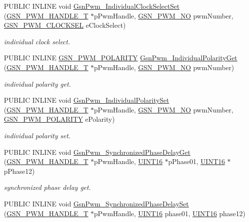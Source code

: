 \begin{DoxyCompactItemize}
PUBLIC INLINE void \hyperlink{a00650_gac6c42db84fde1e336b73ddc0e7099f34}{GsnPwm\_\-IndividualClockSelectSet} (\hyperlink{a00182}{GSN\_\-PWM\_\-HANDLE\_\-T} $\ast$pPwmHandle, \hyperlink{a00650_ga9afe1c7d571460ff2f6780bef6b433df}{GSN\_\-PWM\_\-NO} pwmNumber, \hyperlink{a00650_gafda5110eb592af71b799ed22c7ebf902}{GSN\_\-PWM\_\-CLOCKSEL} eClockSelect)
\begin{DoxyCompactList}\small\item\em individual clock select. \end{DoxyCompactList}\item 
PUBLIC INLINE \hyperlink{a00650_gaea0350ae8992c56b4a1bad6bc7ad5de1}{GSN\_\-PWM\_\-POLARITY} \hyperlink{a00650_ga6be7ff3ec663dc5896cd59c400e1c00b}{GsnPwm\_\-IndividualPolarityGet} (\hyperlink{a00182}{GSN\_\-PWM\_\-HANDLE\_\-T} $\ast$pPwmHandle, \hyperlink{a00650_ga9afe1c7d571460ff2f6780bef6b433df}{GSN\_\-PWM\_\-NO} pwmNumber)
\begin{DoxyCompactList}\small\item\em individual polarity get. \end{DoxyCompactList}\item 
PUBLIC INLINE void \hyperlink{a00650_ga37d8d36f2d0d597eb82ebebd1c4b9953}{GsnPwm\_\-IndividualPolaritySet} (\hyperlink{a00182}{GSN\_\-PWM\_\-HANDLE\_\-T} $\ast$pPwmHandle, \hyperlink{a00650_ga9afe1c7d571460ff2f6780bef6b433df}{GSN\_\-PWM\_\-NO} pwmNumber, \hyperlink{a00650_gaea0350ae8992c56b4a1bad6bc7ad5de1}{GSN\_\-PWM\_\-POLARITY} ePolarity)
\begin{DoxyCompactList}\small\item\em individual polarity set. \end{DoxyCompactList}\item 
PUBLIC INLINE void \hyperlink{a00650_ga8b61d6d4ed2a03b4130ece4db9f2949a}{GsnPwm\_\-SynchronizedPhaseDelayGet} (\hyperlink{a00182}{GSN\_\-PWM\_\-HANDLE\_\-T} $\ast$pPwmHandle, \hyperlink{a00660_ga09f1a1fb2293e33483cc8d44aefb1eb1}{UINT16} $\ast$pPhase01, \hyperlink{a00660_ga09f1a1fb2293e33483cc8d44aefb1eb1}{UINT16} $\ast$pPhase12)
\begin{DoxyCompactList}\small\item\em synchronized phase delay get. \end{DoxyCompactList}\item 
PUBLIC INLINE void \hyperlink{a00650_ga18d17db7a2e95c82aa8e84d1e1897e3e}{GsnPwm\_\-SynchronizedPhaseDelaySet} (\hyperlink{a00182}{GSN\_\-PWM\_\-HANDLE\_\-T} $\ast$pPwmHandle, \hyperlink{a00660_ga09f1a1fb2293e33483cc8d44aefb1eb1}{UINT16} phase01, \hyperlink{a00660_ga09f1a1fb2293e33483cc8d44aefb1eb1}{UINT16} phase12)

\end{DoxyCompactItemize}
